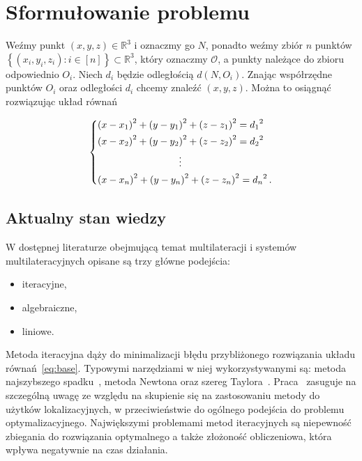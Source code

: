 \chapter{Sformułowanie problemu}\label{chap:problem}

Weźmy punkt $(x, y, z) \in \mathbb{R}^3$ i oznaczmy go $N$, ponadto weźmy zbiór $n$ punktów $\left\{(x_i, y_i, z_i): i \in [n]\right\} \subset \mathbb{R}^3$, który oznaczmy $\mathcal{O}$, a punkty należące do zbioru odpowiednio $O_i$. Niech $d_i$ będzie odległością $d(N, O_i)$. Znając współrzędne punktów $O_i$ oraz odległości $d_i$ chcemy znaleźć $(x, y, z)$. Można to osiągnąć rozwiązując układ równań

\begin{equation}\label{eq:base}
    \begin{dcases}
        {(x - x_1)}^2 + {(y - y_1)}^2 + {(z - z_1)}^2 = {d_1}^2\\
        {(x - x_2)}^2 + {(y - y_2)}^2 + {(z - z_2)}^2 = {d_2}^2\\
        \mspace{150mu}\vdots\\
        {(x - x_n)}^2 + {(y - y_n)}^2 + {(z - z_n)}^2 = {d_n}^2\,.
    \end{dcases}
\end{equation}

\section{Aktualny stan wiedzy}

W dostępnej literaturze obejmującą temat multilateracji i systemów multilateracyjnych opisane są trzy główne podejścia:

\begin{itemize}
    \item iteracyjne,
    \item algebraiczne,
    \item liniowe.
\end{itemize}

Metoda iteracyjna dąży do minimalizacji błędu przybliżonego rozwiązania układu równań~\ref{eq:base}. Typowymi narzędziami w niej wykorzystywanymi są: metoda najszybszego spadku~\cite{doi:10.1137/0111030}, metoda Newtona oraz szereg Taylora~\cite{4101619}. Praca~\cite{4101619} zasuguje na szczególną uwagę ze względu na skupienie się na zastosowaniu metody do użytków lokalizacyjnych, w przeciwieństwie do ogólnego podejścia do problemu optymalizacyjnego. Największymi problemami metod iteracyjnych są niepewność zbiegania do rozwiązania optymalnego a także złożoność obliczeniowa, która wpływa negatywnie na czas działania.

